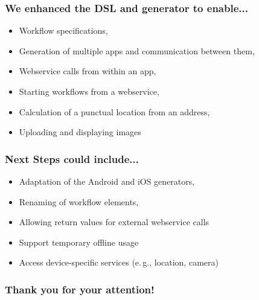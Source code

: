 \begin{frame}[t]
    \frametitle{We enhanced the DSL and generator to enable...}
    
    \begin{itemize}
    	\item Workflow specifications,
    	\item Generation of multiple apps and communication between them,
    	\item Webservice calls from within an app,
    	\item Starting workflows from a webservice,
    	\item Calculation of a punctual location from an address,
    	\item Uploading and displaying images
    \end{itemize}

\end{frame}

\begin{frame}[t]
    \frametitle{Next Steps could include...}

	\begin{itemize}
		\item Adaptation of the Android and iOS generators,
		\item Renaming of workflow elements,
		\item Allowing return values for external webservice calls
		\item Support temporary offline usage
		\item Access device-specific services (e.\,g., location, camera)
	\end{itemize}
\end{frame}

\begin{frame}
\frametitle{Thank you for your attention!}
	\begin{center}
	\end{center}
\end{frame}
